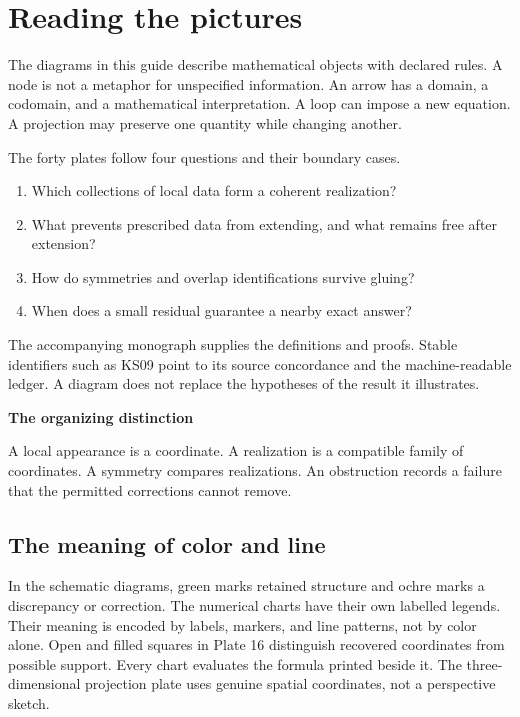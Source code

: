 \documentclass[11pt]{article}
\begin{document}
\KomorebiCover
\section*{Reading the pictures}
The diagrams in this guide describe mathematical objects with declared rules. A node is not a metaphor for unspecified information. An arrow has a domain, a codomain, and a mathematical interpretation. A loop can impose a new equation. A projection may preserve one quantity while changing another.

The forty plates follow four questions and their boundary cases.
\begin{enumerate}
\item Which collections of local data form a coherent realization?
\item What prevents prescribed data from extending, and what remains free after extension?
\item How do symmetries and overlap identifications survive gluing?
\item When does a small residual guarantee a nearby exact answer?
\end{enumerate}

The accompanying monograph supplies the definitions and proofs. Stable identifiers such as KS09 point to its source concordance and the machine-readable ledger. A diagram does not replace the hypotheses of the result it illustrates.

\begin{insight}
\textbf{The organizing distinction}\par
A local appearance is a coordinate. A realization is a compatible family of coordinates. A symmetry compares realizations. An obstruction records a failure that the permitted corrections cannot remove.
\end{insight}

\subsection*{The meaning of color and line}
In the schematic diagrams, green marks retained structure and ochre marks a discrepancy or correction. The numerical charts have their own labelled legends. Their meaning is encoded by labels, markers, and line patterns, not by color alone. Open and filled squares in Plate 16 distinguish recovered coordinates from possible support. Every chart evaluates the formula printed beside it. The three-dimensional projection plate uses genuine spatial coordinates, not a perspective sketch.
\end{document}
